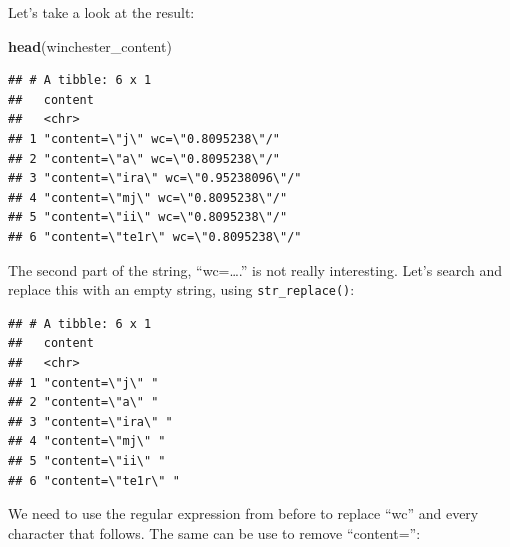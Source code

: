 \documentclass[]{gitbook}
\newenvironment{Shaded}{\begin{snugshade}}{\end{snugshade}}
\newcommand{\DataTypeTok}[1]{\textcolor[rgb]{0.13,0.29,0.53}{#1}}
\newcommand{\KeywordTok}[1]{\textcolor[rgb]{0.13,0.29,0.53}{\textbf{#1}}}
\newcommand{\NormalTok}[1]{#1}
\newcommand{\OperatorTok}[1]{\textcolor[rgb]{0.81,0.36,0.00}{\textbf{#1}}}
\newcommand{\StringTok}[1]{\textcolor[rgb]{0.31,0.60,0.02}{#1}}
\begin{document}
Let's take a look at the result:

\begin{Shaded}
\begin{Highlighting}[]
\KeywordTok{head}\NormalTok{(winchester_content)}
\end{Highlighting}
\end{Shaded}

\begin{verbatim}
## # A tibble: 6 x 1
##   content                             
##   <chr>                               
## 1 "content=\"j\" wc=\"0.8095238\"/"   
## 2 "content=\"a\" wc=\"0.8095238\"/"   
## 3 "content=\"ira\" wc=\"0.95238096\"/"
## 4 "content=\"mj\" wc=\"0.8095238\"/"  
## 5 "content=\"ii\" wc=\"0.8095238\"/"  
## 6 "content=\"te1r\" wc=\"0.8095238\"/"
\end{verbatim}

The second part of the string, ``wc=\ldots{}.'' is not really interesting. Let's search and replace this
with an empty string, using \texttt{str\_replace()}:

\begin{Shaded}
\end{Shaded}

\begin{verbatim}
## # A tibble: 6 x 1
##   content            
##   <chr>              
## 1 "content=\"j\" "   
## 2 "content=\"a\" "   
## 3 "content=\"ira\" " 
## 4 "content=\"mj\" "  
## 5 "content=\"ii\" "  
## 6 "content=\"te1r\" "
\end{verbatim}

We need to use the regular expression from before to replace ``wc'' and every character that follows.
The same can be use to remove ``content='':

\begin{Shaded}
\end{Shaded}
\end{document}
